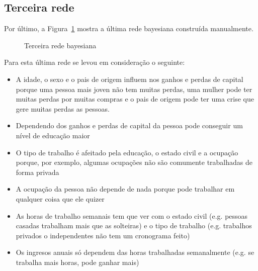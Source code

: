 \subsection{Terceira rede}
	Por último, a Figura~\ref{fig:rede3} mostra a última rede bayesiana construída manualmente.
	\begin{figure}[H]
		\centering
		
		\caption{Terceira rede bayesiana}
		\label{fig:rede3}
	\end{figure}
	Para esta última rede se levou em consideração o seguinte:
	\begin{itemize}
		\item A idade, o sexo e o pais de origem influem nos ganhos e perdas de capital porque uma pessoa mais joven não tem muitas perdas, uma mulher pode ter muitas perdas por muitas compras e o pais de origem pode ter uma crise que gere muitas perdas as pessoas.
		\item Dependendo dos ganhos e perdas de capital da pessoa pode conseguir um nível de educação maior
		\item O tipo de trabalho é afeitado pela educação, o estado civil e a ocupação porque, por exemplo, algumas ocupações não são comumente trabalhadas de forma privada
		\item A ocupação da pessoa não depende de nada porque pode trabalhar em qualquer coisa que ele quizer
		\item As horas de trabalho semanais tem que ver com o estado civil (e.g. pessoas casadas trabalham mais que as solteiras) e o tipo de trabalho (e.g. trabalhos privados o independentes não tem um cronograma feito)
		\item Os ingresos anuais só dependem das horas trabalhadas semanalmente (e.g. se trabalha mais horas, pode ganhar mais)
	\end{itemize}
	
\clearpage